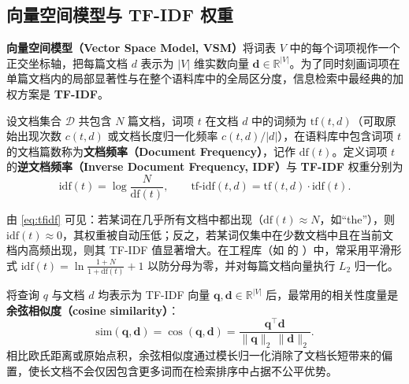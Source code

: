 \subsection{向量空间模型与 TF-IDF 权重}

\textbf{向量空间模型（Vector Space Model, VSM）}将词表 $V$ 中的每个词项视作一个正交坐标轴，把每篇文档 $d$ 表示为 $|V|$ 维实数向量 $\mathbf{d}\in\mathbb{R}^{|V|}$。为了同时刻画词项在单篇文档内的局部显著性与在整个语料库中的全局区分度，信息检索中最经典的加权方案是 \textbf{TF-IDF}。

\begin{definition}[TF-IDF 权重]\label{def:tfidf}
设文档集合 $\mathcal{D}$ 共包含 $N$ 篇文档，词项 $t$ 在文档 $d$ 中的词频为 $\mathrm{tf}(t,d)$（可取原始出现次数 $c(t,d)$ 或文档长度归一化频率 $c(t,d)/|d|$），在语料库中包含词项 $t$ 的文档篇数称为\textbf{文档频率（Document Frequency）}，记作 $\mathrm{df}(t)$。定义词项 $t$ 的\textbf{逆文档频率（Inverse Document Frequency, IDF）}与 \textbf{TF-IDF} 权重分别为
\begin{equation}\label{eq:tfidf}
\mathrm{idf}(t) = \log \frac{N}{\mathrm{df}(t)}, \qquad
\mathrm{tf\text{-}idf}(t, d) = \mathrm{tf}(t, d) \cdot \mathrm{idf}(t).
\end{equation}
\end{definition}

由 \cref{eq:tfidf} 可见：若某词在几乎所有文档中都出现（$\mathrm{df}(t)\approx N$，如“the”），则 $\mathrm{idf}(t)\approx 0$，其权重被自动压低；反之，若某词仅集中在少数文档中且在当前文档内高频出现，则其 TF-IDF 值显著增大。在工程库（如  的 ）中，常采用平滑形式 $\mathrm{idf}(t)=\ln\frac{1+N}{1+\mathrm{df}(t)}+1$ 以防分母为零，并对每篇文档向量执行 $L_2$ 归一化。

将查询 $q$ 与文档 $d$ 均表示为 TF-IDF 向量 $\mathbf{q}, \mathbf{d}\in\mathbb{R}^{|V|}$ 后，最常用的相关性度量是\textbf{余弦相似度（cosine similarity）}：
\begin{equation}\label{eq:cosine}
\mathrm{sim}(\mathbf{q}, \mathbf{d}) = \cos(\mathbf{q}, \mathbf{d})
= \frac{\mathbf{q}^\top \mathbf{d}}{\|\mathbf{q}\|_2\,\|\mathbf{d}\|_2}.
\end{equation}
相比欧氏距离或原始点积，余弦相似度通过模长归一化消除了文档长短带来的偏置，使长文档不会仅因包含更多词而在检索排序中占据不公平优势。

